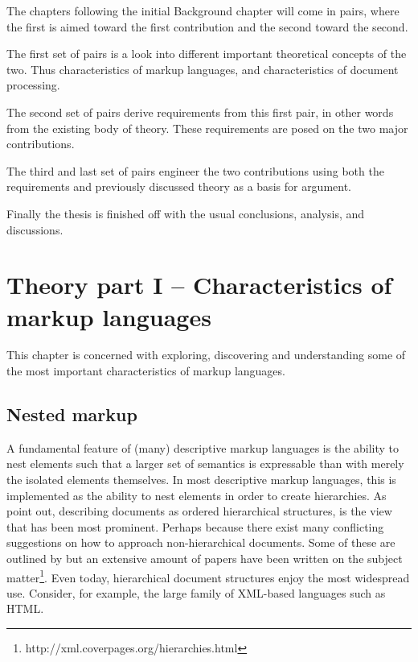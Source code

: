 \documentclass{scrreprt}
\begin{document}
The chapters following the initial Background chapter will come in pairs, where the first is aimed toward the first contribution and the second toward the second.

The first set of pairs is a look into different important theoretical concepts of the two. Thus characteristics of markup languages, and characteristics of document processing.

The second set of pairs derive requirements from this first pair, in other words from the existing body of theory. These requirements are posed on the two major contributions.

The third and last set of pairs engineer the two contributions using both the requirements and previously discussed theory as a basis for argument.

Finally the thesis is finished off with the usual conclusions, analysis, and discussions.


























%
%
%
%
%
%


\chapter{Theory part I -- Characteristics of markup languages}
\label{sec:theory}
This chapter is concerned with exploring, discovering and understanding some of the most important characteristics of markup languages.


\section{Nested markup}
\label{sec:nesting}
A fundamental feature of (many) descriptive markup languages is the ability to nest elements such that a larger set of semantics is expressable than with merely the isolated elements themselves. In most descriptive markup languages, this is implemented as the ability to nest elements in order to create hierarchies. As \citet*{durand} point out, describing documents as ordered hierarchical structures, is the view that has been most prominent. Perhaps because there exist many conflicting suggestions on how to approach non-hierarchical documents. Some of these are outlined by \citet{durand} but an extensive amount of papers have been written on the subject matter\footnote{http://xml.coverpages.org/hierarchies.html}. Even today, hierarchical document structures enjoy the most widespread use. Consider, for example, the large family of XML-based languages such as HTML.
\end{document}
